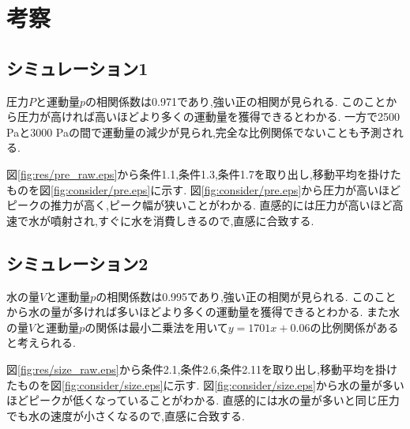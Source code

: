 \section{考察}
\subsection{シミュレーション1}
圧力$P$と運動量$p$の相関係数は0.971であり,強い正の相関が見られる.
このことから圧力が高ければ高いほどより多くの運動量を獲得できるとわかる.
一方で2500 \si{\pascal}と3000 \si{\pascal}の間で運動量の減少が見られ,完全な比例関係でないことも予測される.

図\ref{fig:res/pre_raw.eps}から条件1.1,条件1.3,条件1.7を取り出し,移動平均を掛けたものを図\ref{fig:consider/pre.eps}に示す.
図\ref{fig:consider/pre.eps}から圧力が高いほどピークの推力が高く,ピーク幅が狭いことがわかる.
直感的には圧力が高いほど高速で水が噴射され,すぐに水を消費しきるので,直感に合致する.
\subsection{シミュレーション2}
水の量$V$と運動量$p$の相関係数は0.995であり,強い正の相関が見られる.
このことから水の量が多ければ多いほどより多くの運動量を獲得できるとわかる.
また水の量$V$と運動量$p$の関係は最小二乗法を用いて$y=1701x+0.06$の比例関係があると考えられる.

図\ref{fig:res/size_raw.eps}から条件2.1,条件2.6,条件2.11を取り出し,移動平均を掛けたものを図\ref{fig:consider/size.eps}に示す.
図\ref{fig:consider/size.eps}から水の量が多いほどピークが低くなっていることがわかる.
直感的には水の量が多いと同じ圧力でも水の速度が小さくなるので,直感に合致する.
